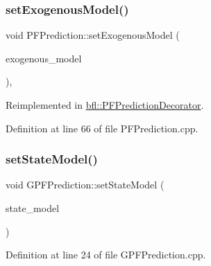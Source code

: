 \subsubsection{\texorpdfstring{set\+Exogenous\+Model()}{setExogenousModel()}}
{\footnotesize\ttfamily void P\+F\+Prediction\+::set\+Exogenous\+Model (\begin{DoxyParamCaption}\item[{std\+::unique\+\_\+ptr$<$ \mbox{\hyperlink{classbfl_1_1ExogenousModel}{Exogenous\+Model}} $>$}]{exogenous\+\_\+model }\end{DoxyParamCaption})\hspace{0.3cm}{\ttfamily [virtual]}, {\ttfamily [inherited]}}



Reimplemented in \mbox{\hyperlink{classbfl_1_1PFPredictionDecorator_a3c38ae386456ecd0fd1b609b381395ec}{bfl\+::\+P\+F\+Prediction\+Decorator}}.



Definition at line 66 of file P\+F\+Prediction.\+cpp.

\mbox{\label{classbfl_1_1GPFPrediction_a29d7a4777cb8007a356b98e66db28f53}} 
\subsubsection{\texorpdfstring{set\+State\+Model()}{setStateModel()}\hspace{0.1cm}{\footnotesize\ttfamily [1/2]}}
{\footnotesize\ttfamily void G\+P\+F\+Prediction\+::set\+State\+Model (\begin{DoxyParamCaption}\item[{std\+::unique\+\_\+ptr$<$ \mbox{\hyperlink{classbfl_1_1StateModel}{bfl\+::\+State\+Model}} $>$}]{state\+\_\+model }\end{DoxyParamCaption})\hspace{0.3cm}{\ttfamily [override]}}



Definition at line 24 of file G\+P\+F\+Prediction.\+cpp.

\mbox{\label{classbfl_1_1PFPrediction_ac39683650d7f89c59f1426dd7743354e}} 
